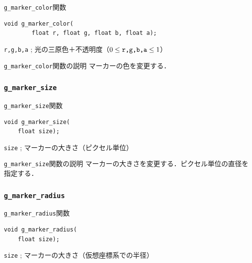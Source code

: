 \documentclass[platex,a4paper,12pt]{jsarticle}%
\begin{document}
\begin{itembox}[l]{\texttt{g\_marker\_color}関数}
\begin{verbatim}
void g_marker_color(
        float r, float g, float b, float a);
\end{verbatim}
\verb|r,g,b,a| ; 光の三原色＋不透明度（$0\leq \verb|r,g,b,a| \leq 1$）
\end{itembox}

\begin{itembox}[l]{\texttt{g\_marker\_color}関数の説明}
マーカーの色を変更する．
\end{itembox}

\subsubsection{\texttt{g\_marker\_size}}

\begin{itembox}[l]{\texttt{g\_marker\_size}関数}
\begin{verbatim}
void g_marker_size(
	float size);
\end{verbatim}
\verb|size| ; マーカーの大きさ（ピクセル単位）
\end{itembox}

\begin{itembox}[l]{\texttt{g\_marker\_size}関数の説明}
マーカーの大きさを変更する．ピクセル単位の直径を指定する．
\end{itembox}

\subsubsection{\texttt{g\_marker\_radius}}

\begin{itembox}[l]{\texttt{g\_marker\_radius}関数}
\begin{verbatim}
void g_marker_radius(
	float size);
\end{verbatim}
\verb|size| ; マーカーの大きさ（仮想座標系での半径）
\end{itembox}
\end{document}
